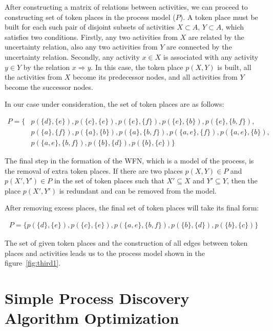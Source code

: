 \documentclass[
11pt,%
tightenlines,%
twoside,%
onecolumn,%
nofloats,%
nobibnotes,%
nofootinbib,%
superscriptaddress,%
noshowpacs,%
centertags]%
{revtex4}
\begin{document}
After constructing a matrix of relations between activities, we can proceed to constructing set of token places in the process model ($P$).
A token place must be built for each such pair of disjoint subsets of activities $X \subset A$, $Y \subset A$, which satisfies two conditions.
Firstly, any two activities from $X$ are related by the uncertainty relation, also any two activities from $Y$ are connected by the uncertainty relation.
Secondly, any activity $x \in X$ is associated with any activity $y \in Y$ by the relation $x \Rightarrow y$.
In this case, the token place $p(X, Y)$ is built, all the activities from $X$ become its predecessor nodes, and all activities from $Y$ become the successor nodes.

In our case under consideration, the set of token places are as follows:

\begin{equation}\label{eqn:p1}
\begin{aligned}
P = \{
& p(\{d\}, \{e\}),
p(\{c\}, \{e\}),
p(\{e\}, \{f\}),
p(\{e\}, \{b\}),
p(\{e\}, \{b, f\}), \\
& p(\{a\}, \{f\}),
p(\{a\}, \{b\}),
p(\{a\}, \{b, f\}),
p(\{a, e\}, \{f\}),
p(\{a, e\}, \{b\}), \\
& p(\{a, e\}, \{b, f\}),
p(\{b\}, \{d\}),
p(\{b\}, \{c\})
\}
\end{aligned}
\end{equation}

The final step in the formation of the WFN, which is a model of the process, is the removal of extra token places.
If there are two places $p(X, Y) \in P$ and $p(X ', Y') \in P$ in the set of token places such that $X' \subseteq X$ and $Y' \subseteq Y$, then the place $p(X', Y')$ is redundant and can be removed from the model.

After removing excess places, the final set of token places will take its final form:

\begin{equation}\label{eqn:p2}
\begin{aligned}
P = \{
p(\{d\}, \{e\}), p(\{c\}, \{e\}), p(\{a, e\}, \{b, f\}), p(\{b\}, \{d\}), p(\{b\}, \{c\})
\}
\end{aligned}
\end{equation}

The set of given token places and the construction of all edges between token places and activities leads us to the process model shown in the figure~\ref{fig:third1}.

\section{Simple Process Discovery Algorithm Optimization}
\end{document}
